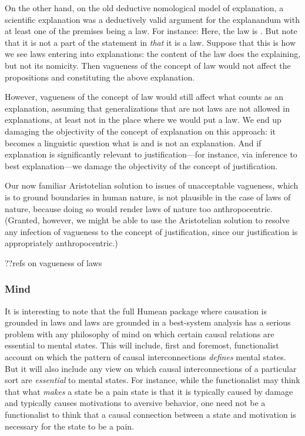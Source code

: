 On the other hand, on the old deductive nomological
model of explanation, a scientific explanation was a deductively valid argument for the explanandum with at least one of the premises
being a law. For instance:
Here, the law is . But note that it is not a part of the statement in  \textit{that} it is a law. 
Suppose that this is how we see laws entering into explanations: the content of the law does the explaining, but not
its nomicity. Then vagueness of the concept of law would not affect the propositions  and  constituting the
above explanation.  

However, vagueness of the concept of law would still affect what counts as an explanation, assuming that generalizations that
are not laws are not allowed in explanations, at least not in the place where we would put a law. We end up damaging the
objectivity of the concept of explanation on this approach: it becomes a linguistic question what is and is not an explanation. 
And if explanation is significantly relevant to justification---for instance, via inference to best explanation---we damage the 
objectivity of the concept of justification.

Our now familiar Aristotelian solution to issues of unacceptable vagueness, which is to ground boundaries in human nature,
is not plausible in the case of laws of nature, because doing so would render laws of nature too anthropocentric. (Granted,
however, we might be able to use the Aristotelian solution to resolve any infection of vagueness to the concept of justification,
since our justification is appropriately anthropocentric.)

??refs on vagueness of laws

\subsubsection{Mind}
It is interesting to note that the full Humean package where causation is grounded in laws and laws are grounded in a best-system 
analysis has a serious problem with any philosophy of mind on which certain causal relations are essential to mental states. This will
include, first and foremost, functionalist account on which the pattern of causal interconnections \textit{defines} mental states.
But it will also include any view on which causal interconnections of a particular sort are \textit{essential} to mental states.
For instance, while the functionalist may think that what \textit{makes} a state be a pain state is that it is typically caused by
damage and typically causes motivations to aversive behavior, one need not be a functionalist to think that a causal connection between a state and
motivation is necessary for the state to be a pain. 

